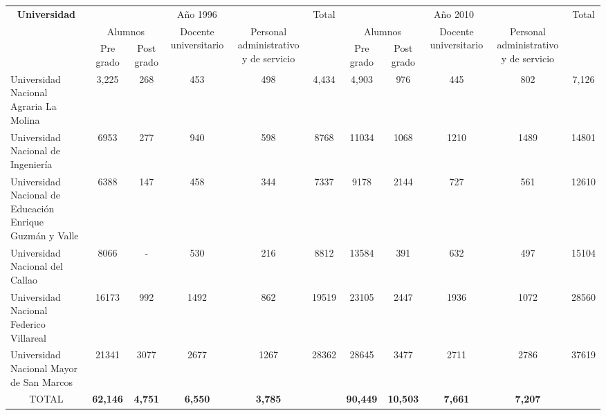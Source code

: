 \documentclass[a6paper,12pt,landscape]{article}
\begin{document}
\begin{table}[H]
	\centering
\begin{tabular}{|l|c|c|c|c|c|c|c|c|c|c|}
	\hline
	\multicolumn{1}{|c|}{\multirow{3}{*}{\textbf{Universidad}}}&\multicolumn{4}{c|}{Año 1996} &\multirow{3}{*}{Total}&\multicolumn{4}{c|}{Año 2010}&\multirow{3}{*}{Total} \\
	\cline{2-5} \cline{7-10}\multicolumn{1}{|c|}{} & \multicolumn{2}{c|}{Alumnos} & \multirow{2}{*}{Docente universitario} & \multirow{2}{*}{Personal administrativo y de servicio} &  & \multicolumn{2}{c|}{Alumnos} & \multirow{2}{*}{Docente universitario} & \multirow{2}{*}{Personal administrativo y de servicio} &  \\ \cline{2-3} \cline{7-8} \multicolumn{1}{|c|}{} & Pre grado  & Post grado &  &  &   & Pre grado  & Post grado  &   &   & \\
	\hline
	Universidad Nacional Agraria La Molina  & 3,225 & 268  & 453  & 498 & 4,434 & 4,903 & 976 & 445  & 802  & 7,126\\
	\hline
	Universidad Nacional de Ingeniería & 6953  & 277 & 940 & 598& 8768 & 11034  & 1068 & 1210 & 1489 & 14801\\
	\hline
	Universidad Nacional de Educación Enrique Guzmán y Valle & 6388  & 147 & 458 & 344  & 7337  & 9178  & 2144 & 727  & 561  & 12610\\
	\hline
	Universidad Nacional del Callao  & 8066  & -  & 530 & 216 & 8812 & 13584& 391& 632 & 497  & 15104  \\ 
	\hline
	Universidad Nacional Federico Villareal& 16173 & 992 & 1492 & 862 & 19519 & 23105 & 2447 & 1936 & 1072 & 28560 \\
	\hline
	Universidad Nacional Mayor de San Marcos & 21341 & 3077 & 2677 & 1267 & 28362 & 28645  & 3477  & 2711 & 2786& 37619 \\
	\hline
	\multicolumn{1}{|c|}{TOTAL} & \textbf{62,146} & \textbf{4,751} & \textbf{6,550} & \textbf{3,785} & \textbf{} & \textbf{90,449} & \textbf{10,503} & \textbf{7,661} & \textbf{7,207}& \textbf{}\\
	\hline
\end{tabular}
\end{table}
\end{document}
